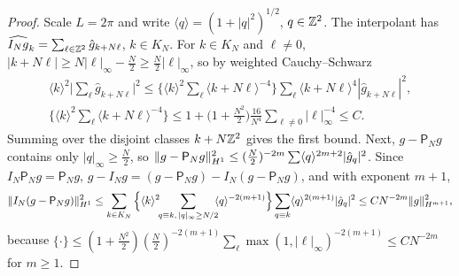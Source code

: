 \begin{proof}
Scale $L=2\pi$ and write $\langle q\rangle=(1+|q|^2)^{1/2}$, $q\in\mathbb{Z}^2$. The interpolant has $\widehat{I_Ng}_k=\sum_{\ell\in\mathbb{Z}^2}\hat g_{k+N\ell}$, $k\in K_N$. For $k\in K_N$ and $\ell\ne0$, $|k+N\ell|\ge N|\ell|_\infty-\frac N2\ge\frac N2|\ell|_\infty$, so by weighted Cauchy--Schwarz
\begin{gather*}
\langle k\rangle^2\Big|\sum_\ell\hat g_{k+N\ell}\Big|^2\le\Big\{\langle k\rangle^2\sum_\ell\langle k+N\ell\rangle^{-4}\Big\}\sum_\ell\langle k+N\ell\rangle^4|\hat g_{k+N\ell}|^2,\\
\Big\{\langle k\rangle^2\sum_\ell\langle k+N\ell\rangle^{-4}\Big\}\le1+\big(1+\tfrac{N^2}2\big)\tfrac{16}{N^4}\sum_{\ell\ne0}|\ell|_\infty^{-4}\le C .
\end{gather*}
Summing over the disjoint classes $k+N\mathbb{Z}^2$ gives the first bound. Next, $g-\mathsf P_Ng$ contains only $|q|_\infty\ge\frac N2$, so $\lVert g-\mathsf P_Ng\rVert_{H^1}^2\le(\frac N2)^{-2m}\sum\langle q\rangle^{2m+2}|\hat g_q|^2$. Since $I_N\mathsf P_Ng=\mathsf P_Ng$, $g-I_Ng=(g-\mathsf P_Ng)-I_N(g-\mathsf P_Ng)$, and with exponent $m+1$,
\[
\lVert I_N(g-\mathsf P_Ng)\rVert_{H^1}^2\le\sum_{k\in K_N}\Big\{\langle k\rangle^2\!\!\sum_{q\equiv k,\,|q|_\infty\ge N/2}\!\!\langle q\rangle^{-2(m+1)}\Big\}\sum_{q\equiv k}\langle q\rangle^{2(m+1)}|\hat g_q|^2\le CN^{-2m}\lVert g\rVert_{H^{m+1}}^2,
\]
because $\{\cdot\}\le(1+\frac{N^2}2)(\frac N2)^{-2(m+1)}\sum_{\ell}\max(1,|\ell|_\infty)^{-2(m+1)}\le CN^{-2m}$ for $m\ge1$.
\end{proof}

